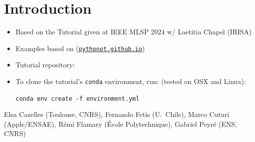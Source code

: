\documentclass[pdf,aspectratio=169,10pt]{beamer}
\begin{document}
\section*{Introduction}
\begin{frame}
\begin{itemize}
    \item Based on the Tutorial  given at IEEE MLSP 2024 w/ Laetitia Chapel (IRISA)
    \item Examples based on  (\href{https://pythonot.github.io/}{\texttt{pythonot.github.io}})
    \item Tutorial repository: 
    \item To clone the tutorial's \texttt{conda} environment, run: (tested on OSX and Linux):
    \vspace{1em}
    \begin{tcolorbox}[colback=blue!5!white,colframe=blue!75!black]
    \centering
  \texttt{conda env create -f environment.yml}
\end{tcolorbox}


\end{itemize}
\vspace{3em}
 Elsa Cazelles (Toulouse, CNRS), Fernando Fetis (U.~Chile), Marco Cuturi (Apple/ENSAE), Rémi Flamary (École Polytechnique), Gabriel Peyré (ENS, CNRS) 

\end{frame}
\end{document}
